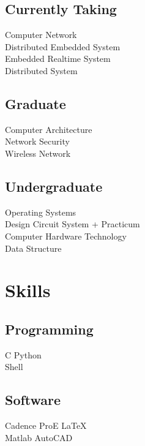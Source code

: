 \documentclass[]{deedy-resume}
\begin{document}
\begin{minipage}[t]{0.33\textwidth}
\subsection{Currently Taking}
Computer Network \\
Distributed Embedded System\\
Embedded Realtime System\\
Distributed System\\
\sectionsep

\subsection{Graduate}
Computer Architecture \\
Network Security \\
Wireless Network \\
\sectionsep

\subsection{Undergraduate}
Operating Systems \\
Design Circuit System + Practicum\\
Computer Hardware Technology \\
Data Structure \\
\sectionsep


\section{Skills}
\subsection{Programming}
C \textbullet{} Python \\
Shell\\
\sectionsep

\subsection{Software}
Cadence \textbullet{} ProE \textbullet{} \LaTeX  \\
Matlab \textbullet{} AutoCAD
\sectionsep

%
%

\end{minipage}
\end{document}
